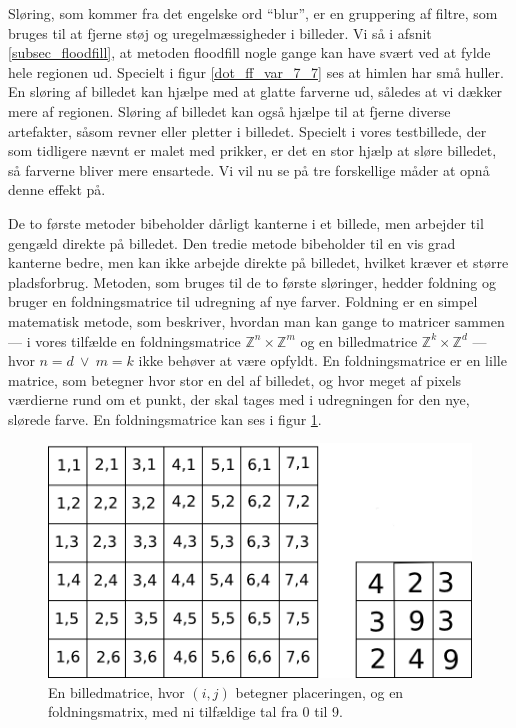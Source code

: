 {
Sløring, som kommer fra det engelske ord ``blur'', er en gruppering af
filtre, som bruges til at fjerne støj og uregelmæssigheder i billeder.
Vi så i afsnit \ref{subsec_floodfill}, at metoden floodfill nogle gange
kan have svært ved at fylde hele regionen ud. Specielt i figur
\ref{dot_ff_var_7_7} ses at himlen har små huller. En sløring af
billedet kan hjælpe med at glatte farverne ud, således at vi dækker mere
af regionen. Sløring af billedet kan også hjælpe til at fjerne diverse
artefakter, såsom revner eller pletter i billedet. Specielt i vores
testbillede, der som tidligere nævnt er malet med prikker, er det en
stor hjælp at sløre billedet, så farverne bliver mere ensartede. Vi vil
nu se på tre forskellige måder at opnå denne effekt på.

De to første metoder bibeholder dårligt kanterne i et billede, men
arbejder til gengæld direkte på billedet. Den tredie metode bibeholder
til en vis grad kanterne bedre, men kan ikke arbejde direkte på
billedet, hvilket kræver et større pladsforbrug. Metoden, som bruges til
de to første sløringer, hedder foldning og bruger en foldningsmatrice til
udregning af nye farver. Foldning er en simpel matematisk metode, som
beskriver, hvordan man kan gange to matricer sammen --- i vores tilfælde
en foldningsmatrice $\mathbb{Z}^{n}\times{} \mathbb{Z}^{m}$ og en
billedmatrice $\mathbb{Z}^{k}\times{} \mathbb{Z}^{d}$ --- hvor $n = d ~\vee~
m = k$ ikke behøver at være opfyldt.  En foldningsmatrice er en lille
matrice, som betegner hvor stor en del af billedet, og hvor meget af
pixels værdierne rund om et punkt, der skal tages med i udregningen for
den nye, slørede farve. En foldningsmatrice kan ses i figur \ref{Foldning}.

\begin{figure}[]
	\begin{center}
		\includegraphics[scale=0.9,angle=0]{afsnit/vores_implementation/billeder/sloering/convolution.png}
	\end{center}
    \caption[]{En billedmatrice, hvor $(i,j)$ betegner placeringen, og en
    foldningsmatrix, med ni tilfældige tal fra 0 til 9.}
	\label{Foldning}
\end{figure}

}
